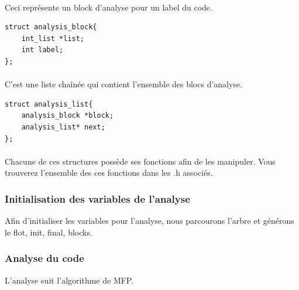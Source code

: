 \documentclass[12pt,a4paper,oneside]{article}
\begin{document}
\paragraph{}
Ceci représente un block d'analyse pour un label du code.
\begin{lstlisting}
struct analysis_block{
	int_list *list;
	int label;
};
\end{lstlisting}

\paragraph{}
C'est une liste chaînée qui contient l'ensemble des blocs d'analyse.
\begin{lstlisting}
struct analysis_list{
	analysis_block *block;
	analysis_list* next;
};
\end{lstlisting}

\paragraph{}
Chacune de ces structures possède ses fonctions afin de les manipuler.
Vous trouverez l'ensemble des ces fonctions dans les .h associés.

\subsubsection{Initialisation des variables de l'analyse}
Afin d'initialiser les variables pour l'analyse, nous parcourons l'arbre et générons le flot, init, final, blocks.

\subsubsection{Analyse du code}
L'analyse suit l'algorithme de MFP.

\newpage
\end{document}

